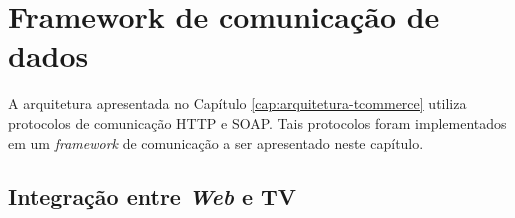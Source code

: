 \documentclass[a4paper,12pt,openright,titlepage,oneside]{book}
\begin{document}
%
%
%
%

%
%






\chapter{Framework de comunicação de dados} \label{cap:ncluasoap}

A arquitetura apresentada no Capítulo \ref{cap:arquitetura-tcommerce}
utiliza protocolos de comunicação HTTP e SOAP. Tais protocolos foram
implementados em um \textit{framework} de comunicação a ser apresentado neste capítulo.

\section{Integração entre \textit{Web} e TV}




%





\end{document}
